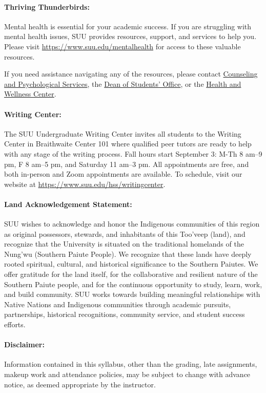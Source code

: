 \documentclass[12pt, letterpaper]{article}
\begin{document}
\paragraph{Thriving Thunderbirds:}
Mental health is essential for your academic success. If you are struggling with mental health issues, SUU provides resources, support, and services to help you. Please visit \href{https://www.suu.edu/mentalhealth}{https://www.suu.edu/mentalhealth} for access to these valuable resources.

\noindent
If you need assistance navigating any of the resources, please contact \href{https://www.suu.edu/caps/}{Counseling and Psychological Services}, the \href{https://www.suu.edu/deanofstudents/}{Dean of Students’ Office}, or the \href{https://www.suu.edu/health/}{Health and Wellness Center}.

\paragraph{Writing Center:}
The SUU Undergraduate Writing Center invites all students to the Writing Center in Braithwaite Center 101 where qualified peer tutors are ready to help with any stage of the writing process. Fall hours start September 3: M-Th 8 am–9 pm, F 8 am–5 pm, and Saturday 11 am–3 pm. All appointments are free, and both in-person and Zoom appointments are available. To schedule, visit our website at \href{https://www.suu.edu/hss/writingcenter}{https://www.suu.edu/hss/writingcenter}.

\paragraph{Land Acknowledgement Statement:}
SUU wishes to acknowledge and honor the Indigenous communities of this region as original possessors, stewards, and inhabitants of this Too’veep (land), and recognize that the University is situated on the traditional homelands of the Nung’wu (Southern Paiute People). We recognize that these lands have deeply rooted spiritual, cultural, and historical significance to the Southern Paiutes. We offer gratitude for the land itself, for the collaborative and resilient nature of the Southern Paiute people, and for the continuous opportunity to study, learn, work, and build community. SUU works towards building meaningful relationships with Native Nations and Indigenous communities through academic pursuits, partnerships, historical recognitions, community service, and student success efforts.

\paragraph{Disclaimer:}
Information contained in this syllabus, other than the grading, late assignments, makeup work and attendance policies, may be subject to change with advance notice, as deemed appropriate by the instructor.
\end{document}
